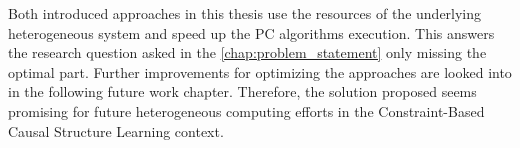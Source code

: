 Both introduced approaches in this thesis use the resources of the underlying heterogeneous system and speed up the PC algorithms execution. This answers the research question asked in the \ref{chap:problem_statement} only missing the optimal part. Further improvements for optimizing the approaches are looked into in the following future work chapter. Therefore, the solution proposed seems promising for future heterogeneous computing efforts in the Constraint-Based Causal Structure Learning context.
% 
% 
% 
% 
% 
% 